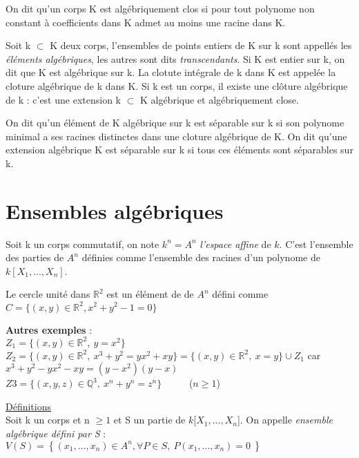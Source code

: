 \documentclass[a4paper,10pt]{article}
\begin{document}
On dit qu'un corps K est algébriquement clos si pour tout polynome non constant à coefficients dans K admet au moins une racine dans K.

Soit k $ \subset $ K deux corps, l'ensembles de points entiers de K sur k sont appellés les \textit{éléments algébriques}, les autres sont dits \textit{transcendants}. Si K est entier sur k, on dit que K est algébrique sur k. La clotute intégrale de k dans K est appelée la cloture algébrique de k dans K. Si k est un corps, il existe une clôture algébrique de k :
c’est une extension k $\subset$ K algébrique et algébriquement close.

On dit qu'un élément de K algébrique sur k est séparable sur k si son polynome minimal a ses  racines distinctes dans une cloture algébrique de K. On dit qu'une extension algébrique K est séparable sur k si tous ces éléments sont séparables sur k.



\section{Ensembles algébriques}

Soit k un corps commutatif, on note $k^{n} = A^{n}$ \textit{l'espace affine} de $k$. C'est l'ensemble des parties de $A^{n}$ définies comme l'ensemble des racines d'un polynome de $k[X_{1},...,X_{n}]$.

Le cercle unité dans $\mathbb{R}^{2}$ est un élément de de $A^{n}$ défini comme $C= \{(x,y) \in \mathbb{R}^{2} , x^{2} + y^{2} - 1 = 0 \} $ 


\centering
{}


\flushleft \textbf{Autres exemples} :\\
 $Z_{1}=\{(x,y) \in \mathbb{R}^{2},\ y = x^{2}  \}$\\
 $Z_{2} = \{(x,y) \in \mathbb{R} ^{2}, \ x^{3} +  y^{2} = yx^{2} + xy \}  = \{(x,y) \in \mathbb{R} ^{2}, \ x = y\} \cup Z_{1}$  car \ $x^{3} + y^{2} - yx^{2} - xy = (y-x^{2})(y-x) $
\\ $ Z{3} =\{(x,y,z) \in \mathbb{Q}^{3},\ x^{n} + y^{n} = z^{n}\} $   \ \ \ \ \ ($n\geq 1 $)

\underline{Définitions} 
\\
Soit k un corps et n $\geq 1$ et S un partie de $k$[$X_{1},...,X_{n}$]. On appelle \textit{ensemble algébrique défini par S} : \\ \center $V(S) = \left\{  (x_{1}, ... , x_{n}) \in A^{n} , \forall P \in S , \ P(x_{1}, ... , x_{n}) = 0 \ \right\}$
\flushleft
\end{document}
